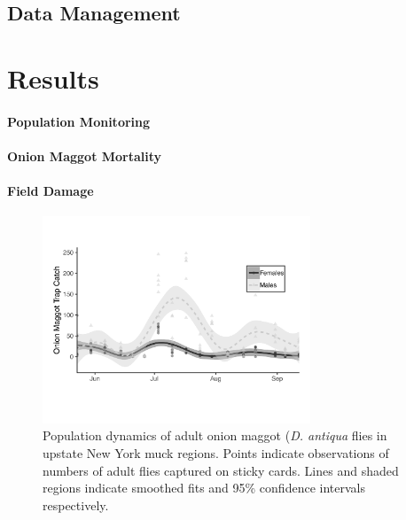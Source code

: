 \documentclass[alpha-refs]{wiley-article}
\begin{document}
\subsection{Data Management}


\section{Results}

\paragraph{Population Monitoring}

\paragraph{Onion Maggot Mortality}

\paragraph{Field Damage}



\begin{figure}[bt]
\centering
\includegraphics[width = 8cm]{figures/final-figures/figure-1.pdf}
\caption{Population dynamics of adult onion maggot (\textit{D. antiqua} flies in upstate New York muck regions.  Points indicate observations of numbers of adult flies captured on sticky cards.  Lines and shaded regions indicate smoothed fits and 95\% confidence intervals respectively.  }
\label{fig:figure1}
\end{figure}
\end{document}
